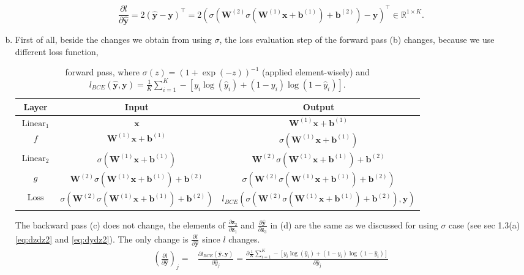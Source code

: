 \documentclass[10pt,a4paper]{article}
\theoremstyle{dotlessP}
\def\RR{\mathbb{R}}
\DeclareRobustCommand{\linear}{\operatorname*{Linear}}
\DeclareRobustCommand{\loss}{\operatorname*{Loss}}
\newcommand{\dldy}{\frac{\partial l}{\partial \bm{\hat{y}}}}
\newcommand{\dydz}{\frac{\partial \bm{\hat{y}}}{\partial \bm z_3}}
\newcommand{\dzdz}{\frac{\partial \bm z_2}{\partial \bm z_1}}
\newcommand{\yh}{\bm{\hat{y}}}
\begin{document}
\begin{enumerate}[(a)]
\begin{equation}
\dldy = 2(\yh -\bm y)^\top =2 \left(\sigma\left(\bm W^{(2)}\sigma\left(\bm W^{(1)} \bm x+\bm b^{(1)}\right) + \bm b^{(2)}\right)-\bm y\right)^\top\in \RR^{1\times K}.
\end{equation}
\item First of all, beside the changes we obtain from using $\sigma$,  the loss evaluation step of the forward pass (b) changes, because we use different loss function,
	\begin{table}[tbhp] 
	{\footnotesize
		\caption{ forward pass, where $\sigma(z)=(1+\exp(-z))^{-1}$ (applied element-wisely) and $l_{BCE}(\yh, \bm y)=\frac{1}{K}\sum_{i=1}^{K}-[y_i\log(\hat{y}_i)+(1-y_i)\log(1-\hat{y}_i)]$.
		}\label{tab:fw3}
		\begin{center}
			\renewcommand{\arraystretch}{1.5}
			\begin{tabular}{|c|c|c|}
				\hline 
				Layer & Input  & Output \\ 
				\hline 
				$\linear_1$& $\bm x$ & $\bm W^{(1)} \bm x+\bm b^{(1)}$ \\ 
				\hline 
				$f$	&$\bm W^{(1)} \bm x+\bm b^{(1)}$&  $\sigma\left(\bm W^{(1)} \bm x+\bm b^{(1)}\right)$\\ 
				\hline 
				$\linear_2$& $\sigma\left(\bm W^{(1)} \bm x+\bm b^{(1)}\right)$ & $\bm W^{(2)}\sigma\left(\bm W^{(1)} \bm x+\bm b^{(1)}\right) + \bm b^{(2)}$ \\ 
				\hline 
				$g$	& $\bm W^{(2)}\sigma\left(\bm W^{(1)} \bm x+\bm b^{(1)}\right) + \bm b^{(2)}$ &  $\sigma\left(\bm W^{(2)}\sigma\left(\bm W^{(1)} \bm x+\bm b^{(1)}\right) + \bm b^{(2)}\right)$\\ 
				\hline 
				$\loss$	& $\sigma\left(\bm W^{(2)}\sigma\left(\bm W^{(1)} \bm x+\bm b^{(1)}\right) + \bm b^{(2)}\right)$ & $l_{BCE}(\sigma\left(\bm W^{(2)}\sigma\left(\bm W^{(1)} \bm x+\bm b^{(1)}\right) + \bm b^{(2)}\right), \bm y)$ \\ 
				\hline 
			\end{tabular} 
		\end{center}
	}
\end{table}
The backward pass (c) does not change, the elements of $\dzdz$ and $\dydz$ in (d) are the same as we discussed for using $\sigma$ case (see sec 1.3(a) \eqref{eq:dzdz2} and \eqref{eq:dydz2}). The only change is $\dldy$ since $l$ changes.
\begin{equation}
\begin{aligned}
\left(\dldy\right)_j = &\frac{\partial l_{BCE}(\yh,\bm y)}{\partial \hat{y}_j}= \frac{\partial\frac{1}{K}\sum_{i=1}^{K}-[y_i\log(\hat{y}_i)+(1-y_i)\log(1-\hat{y}_i)]}{\partial \hat{y}_j} \\

\end{aligned}
\end{equation}
\end{enumerate}
\end{document}

